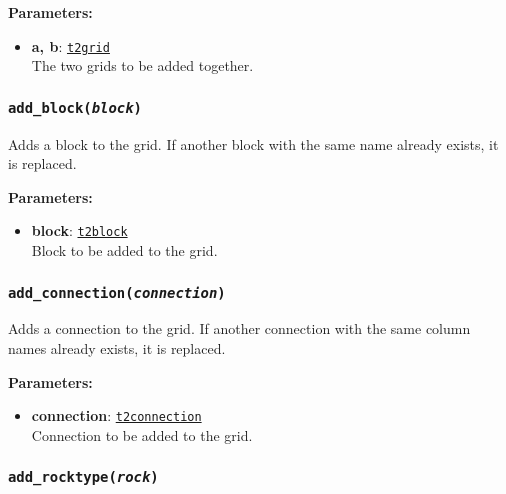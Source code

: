 \textbf{Parameters:}
\begin{itemize}
\item \textbf{a, b}: \hyperref[t2grids]{\texttt{t2grid}}\\
  The two grids to be added together.
\end{itemize}

\begin{snugshade}
\subsubsection{\texttt{add\_block(\emph{block})}}
\end{snugshade}
\label{sec:t2grid:add_block}

Adds a block to the grid.  If another block with the same name already exists, it is replaced.

\textbf{Parameters:}
\begin{itemize}
\item \textbf{block}: \hyperref[t2blockobjects]{\texttt{t2block}}\\
  Block to be added to the grid.
\end{itemize}

\begin{snugshade}
\subsubsection{\texttt{add\_connection(\emph{connection})}}
\end{snugshade}
\label{sec:t2grid:add_connection}

Adds a connection to the grid.  If another connection with the same column names already exists, it is replaced.

\textbf{Parameters:}
\begin{itemize}
\item \textbf{connection}: \hyperref[t2connectionobjects]{\texttt{t2connection}}\\
  Connection to be added to the grid.
\end{itemize}

\begin{snugshade}
\subsubsection{\texttt{add\_rocktype(\emph{rock})}}
\end{snugshade}
\label{sec:t2grid:add_rocktype}

